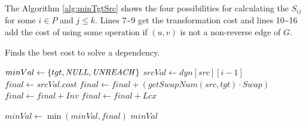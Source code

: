 \documentclass[paper=a4, fontsize=12pt]{scrartcl}
\begin{document}
	The Algorithm \ref{alg:minTgtSrc} shows the four possibilities for calculating the $S_{ij}$ for some $i \in P$ and $j \leq k$. Lines 7\textasciitilde9 get the transformation cost and lines 10\textasciitilde16 add the cost of using some operation if $(u, v)$ is not a non-reverse edge of $G$.

	\begin{algorithm}
		\caption{Finds the best cost to solve a dependency.}
		\begin{algorithmic}[1]
			\Statex
			\State $minVal \gets \{tgt, \textrm{\textit{NULL}}, \textrm{\textit{UNREACH}}\}$
			\State $srcVal \gets dyn[src][i-1]$
			\State $final \gets srcVal.cost$
			\State $final \gets final + (getSwapNum(src, tgt) \cdot Swap)$
			\EndIf
			\State $final \gets final + Inv$
			\Else
			\State $final \gets final + Lcx$
			\EndIf
			\EndIf
			
			\State $minVal \gets \min(minVal, final)$
			\EndIf
			\EndFor
			\State \Return $minVal$
			\EndFunction
		\end{algorithmic}
		\label{alg:minTgtSrc}
	\end{algorithm}
\end{document}
